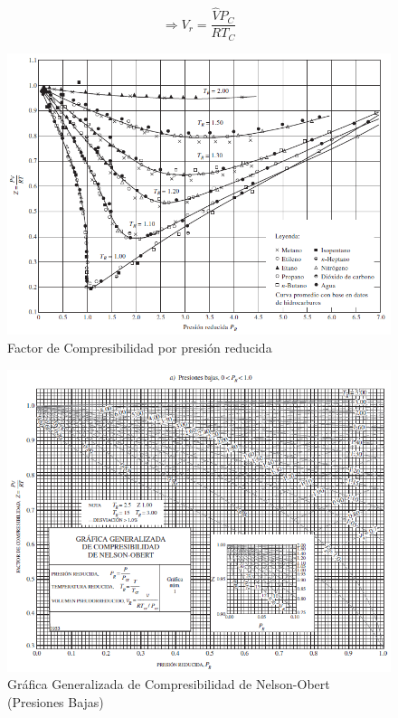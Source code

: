             \[\Rightarrow V_{r} = \frac{\widehat{V}{P}_{C}}{R{T}_{C}}\]
            
            \begin{figure}
                \centering
                \includegraphics[width=\textwidth]{img/diagramas/par_red.png}
                \caption[Factor de Compresibilidad por presión reducida]{Factor de Compresibilidad por presión reducida \cite{cengel_termodinamica_2012}}
                \label{fig:par_red}
            \end{figure}
            
            
            \begin{figure}
                \centering
                \includegraphics[width=\textwidth]{img/diagramas/nelson_obert_1.png}
                \caption[Gráfica Generalizada de Compresibilidad de Nelson-Obert (Presiones Bajas)]{Gráfica Generalizada de Compresibilidad de Nelson-Obert (Presiones Bajas) \cite{cengel_termodinamica_2012}}
                \label{fig:nelson_obert_1}
            \end{figure}
            
